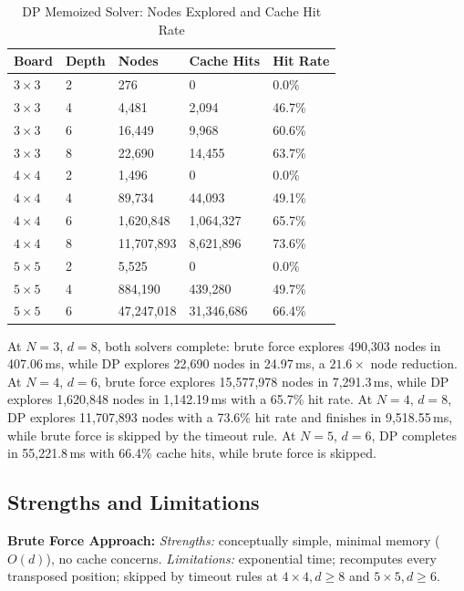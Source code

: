 \documentclass[conference]{IEEEtran}
\begin{document}
\begin{table}[htbp]
\centering
\caption{DP Memoized Solver: Nodes Explored and Cache Hit Rate}
\label{tab:cachehit}
\renewcommand{\arraystretch}{1.6}
\begin{tabular}{|p{1.4cm}|p{0.7cm}|p{1.5cm}|p{1.3cm}|p{1.2cm}|}
\hline
\textbf{Board} & \textbf{Depth} & \textbf{Nodes} &
\textbf{Cache Hits} & \textbf{Hit Rate} \\
\hline
$3{\times}3$ & 2 &       276 &         0 & 0.0\% \\
\hline
$3{\times}3$ & 4 &     4,481 &     2,094 & 46.7\% \\
\hline
$3{\times}3$ & 6 &    16,449 &     9,968 & 60.6\% \\
\hline
$3{\times}3$ & 8 &    22,690 &    14,455 & 63.7\% \\
\hline
$4{\times}4$ & 2 &     1,496 &         0 & 0.0\% \\
\hline
$4{\times}4$ & 4 &    89,734 &    44,093 & 49.1\% \\
\hline
$4{\times}4$ & 6 & 1,620,848 & 1,064,327 & 65.7\% \\
\hline
$4{\times}4$ & 8 & 11,707,893 & 8,621,896 & 73.6\% \\
\hline
$5{\times}5$ & 2 &     5,525 &         0 & 0.0\% \\
\hline
$5{\times}5$ & 4 &   884,190 &   439,280 & 49.7\% \\
\hline
$5{\times}5$ & 6 & 47,247,018 & 31,346,686 & 66.4\% \\
\hline
\end{tabular}
\end{table}

At $N = 3$, $d = 8$, both solvers complete: brute force explores
490,303 nodes in 407.06\,ms, while DP explores 22,690 nodes in
24.97\,ms, a $21.6{\times}$ node reduction. At $N = 4$, $d = 6$, brute
force explores 15,577,978 nodes in 7,291.3\,ms, while DP explores
1,620,848 nodes in 1,142.19\,ms with a 65.7\% hit rate. At $N = 4$,
$d = 8$, DP explores 11,707,893 nodes with a 73.6\% hit rate and
finishes in 9,518.55\,ms, while brute force is skipped by the timeout
rule. At $N = 5$, $d = 6$, DP completes in 55,221.8\,ms with 66.4\%
cache hits, while brute force is skipped.

\subsection{Strengths and Limitations}
\textbf{Brute Force Approach:}
\textit{Strengths:} conceptually simple, minimal memory ($O(d)$), no
cache concerns.
\textit{Limitations:} exponential time; recomputes every transposed
position; skipped by timeout rules at $4\times4, d\ge 8$ and
$5\times5, d\ge 6$.
\end{document}
